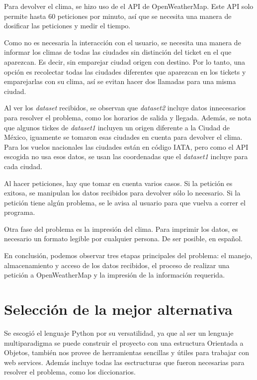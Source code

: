 \documentclass[]{article}
\begin{document}
Para devolver el clima, se hizo uso de el API de OpenWeatherMap. Este API
solo permite hasta 60 peticiones por minuto, así que se necesita una 
manera de dosificar las peticiones y medir el tiempo.

Como no es necesaria la interacción con el usuario, se necesita 
una manera de informar los climas de todas las ciudades sin distinción del 
ticket en el que aparezcan. Es decir, sin emparejar ciudad origen con 
destino. Por lo tanto, una opción es recolectar todas las ciudades 
diferentes que aparezcan en los tickets y emparejarlas con su clima, así 
se evitan hacer dos llamadas para una misma ciudad.

Al ver los \emph{dataset} recibidos, se observan que \emph{dataset2} incluye 
datos innecesarios para resolver el problema, como los horarios de salida y 
llegada. Además, se nota que algunos tickes de \emph{dataset1} incluyen un 
origen diferente a la Ciudad de México, iguamente se tomaron esas ciudades 
en cuenta para devolver el clima. Para los vuelos nacionales las ciudades 
están en código IATA, pero como el API escogida no usa esos datos, se usan 
las coordenadas que el \emph{dataset1} incluye para cada ciudad. 

Al hacer peticiones, hay que tomar en cuenta varios casos. Si la petición 
es exitosa, se manipulan los datos recibidos para devolver sólo lo 
necesario. Si la petición tiene algún problema, se le avisa al usuario para 
que vuelva a correr el programa. 

Otra fase del problema es la impresión del clima. Para imprimir los datos, es 
necesario un formato legible por cualquier persona. De ser posible, en 
español.

En conclusión, podemos observar tres etapas principales del problema: 
el manejo, almacenamiento y acceso de los datos recibidos, el proceso de 
realizar una petición a OpenWeatherMap y la impresión de la información 
requerida.

\section{Selección de la mejor alternativa}
Se escogió el lenguaje Python por su versatilidad, ya que al ser un lenguaje 
multiparadigma se puede construir el proyecto con una estructura Orientada 
a Objetos, también nos provee de herramientas sencillas y útiles para 
trabajar con web services. Además incluye todas las esctructuras que fueron 
necesarias para resolver el problema, como los diccionarios.
\end{document}
